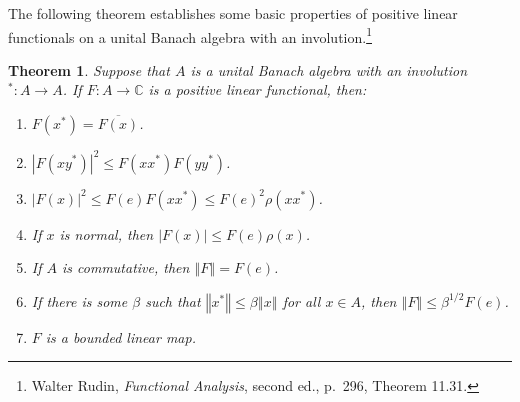 \documentclass{article}
\newcommand{\norm}[1]{\left\Vert #1 \right\Vert}
\newtheorem{theorem}{Theorem}
\theoremstyle{definition}
\begin{document}
The following theorem establishes some basic properties of 
positive linear functionals on a unital Banach algebra with an involution.\footnote{Walter Rudin, {\em Functional Analysis}, second ed., p.~296, Theorem 11.31.}

\begin{theorem}
Suppose that $A$ is a unital Banach algebra with an involution $^*:A \to A$. 
If $F:A \to \mathbb{C}$ is a positive linear functional, then:
\begin{enumerate}
\item $F(x^*)=\overline{F(x)}$.
\item $|F(xy^*)|^2 \leq F(xx^*)F(yy^*)$.
\item $|F(x)|^2 \leq F(e)F(xx^*) \leq F(e)^2 \rho(xx^*)$.
\item If $x$ is normal, then $|F(x)| \leq F(e)\rho(x)$.
\item If $A$ is commutative, then $\norm{F}=F(e)$. 
\item If there is some $\beta$ such that $\norm{x^*} \leq 
\beta \norm{x}$ for all $x \in A$, then $\norm{F} \leq \beta^{1/2} F(e)$.
\item $F$ is a bounded linear map. 
\end{enumerate}
\label{positivefunctional}
\end{theorem}
\end{document}
